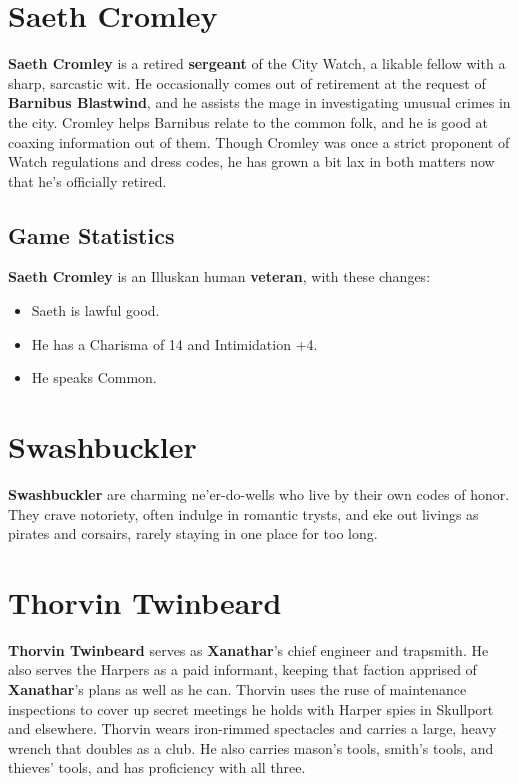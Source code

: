 \documentclass[10pt,a4paper,twoside,twocolumn,openany,nodeprecatedcode]{dndbook}
\begin{document}
\section{Saeth Cromley}
\textbf{Saeth Cromley} is a retired \textbf{sergeant} of the City Watch, a likable fellow with a sharp, sarcastic wit. He occasionally comes out of retirement at the request of \textbf{Barnibus Blastwind}, and he assists the mage in investigating unusual crimes in the city. Cromley helps Barnibus relate to the common folk, and he is good at coaxing information out of them. Though Cromley was once a strict proponent of Watch regulations and dress codes, he has grown a bit lax in both matters now that he's officially retired.
\subsection{Game Statistics}
\textbf{Saeth Cromley} is an Illuskan human \textbf{veteran}, with these changes:
\begin{itemize}

\item Saeth is lawful good.
\item He has a Charisma of 14 and Intimidation +4.
\item He speaks Common.
\end{itemize}


\section{Swashbuckler}
\textbf{Swashbuckler} are charming ne'er-do-wells who live by their own codes of honor. They crave notoriety, often indulge in romantic trysts, and eke out livings as pirates and corsairs, rarely staying in one place for too long.
\section{Thorvin Twinbeard}
\textbf{Thorvin Twinbeard} serves as \textbf{Xanathar}'s chief engineer and trapsmith. He also serves the Harpers as a paid informant, keeping that faction apprised of \textbf{Xanathar}'s plans as well as he can. Thorvin uses the ruse of maintenance inspections to cover up secret meetings he holds with Harper spies in Skullport and elsewhere.
Thorvin wears iron-rimmed spectacles and carries a large, heavy wrench that doubles as a club. He also carries mason's tools, smith's tools, and thieves' tools, and has proficiency with all three.
\end{document}
